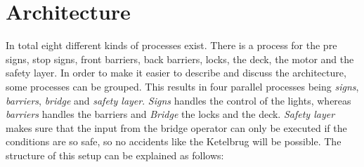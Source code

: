 \section{Architecture}
\label{sec:arch}

In total eight different kinds of processes exist. There is a process for the pre signs, stop signs, front barriers, back barriers, locks, the deck, the motor and the safety layer. In order to make it easier to describe and discuss the architecture, some processes can be grouped. This results in four parallel processes being \emph{signs}, \emph{barriers}, \emph{bridge} and \emph{safety layer}. \emph{Signs} handles the control of the lights, whereas \emph{barriers} handles the barriers and \emph{Bridge} the locks and the deck. \emph{Safety layer} makes sure that the input from the bridge operator can only be executed if the conditions are so safe, so no accidents like the Ketelbrug will be possible. The structure of this setup can be explained as follows:
%
